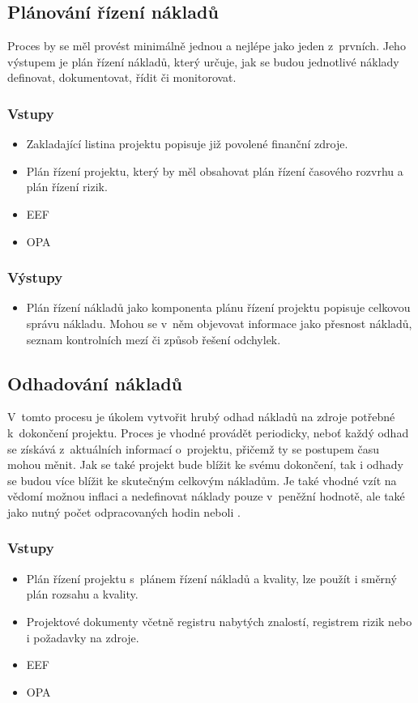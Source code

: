\subsection*{Plánování řízení nákladů}

Proces by se měl provést minimálně jednou a nejlépe jako jeden z~prvních. Jeho výstupem je plán řízení nákladů, který určuje, jak se budou jednotlivé náklady definovat, dokumentovat, řídit či monitorovat.

\subsubsection*{Vstupy}
\begin{itemize}
    \item Zakladající listina projektu popisuje již povolené finanční zdroje.
    \item Plán řízení projektu, který by měl obsahovat plán řízení časového rozvrhu a plán řízení rizik.
    \item EEF
    \item OPA
\end{itemize}
\subsubsection*{Výstupy}
\begin{itemize}
    \item Plán řízení nákladů jako komponenta plánu řízení projektu popisuje celkovou správu nákladu. Mohou se v~něm objevovat informace jako přesnost nákladů, seznam kontrolních mezí či způsob řešení odchylek. 
\end{itemize}

\subsection*{Odhadování nákladů}

V~tomto procesu je úkolem vytvořit hrubý odhad nákladů na zdroje potřebné k~dokončení projektu. Proces je vhodné provádět periodicky, neboť každý odhad se získává z~aktuálních informací o~projektu, přičemž ty se postupem času mohou měnit. Jak se také projekt bude blížit ke svému dokončení, tak i odhady se budou více blížit ke skutečným celkovým nákladům. Je také vhodné vzít na vědomí možnou inflaci a nedefinovat náklady pouze v~peněžní hodnotě, ale také jako nutný počet odpracovaných hodin neboli .


\subsubsection*{Vstupy}
\begin{itemize}
    \item Plán řízení projektu s~plánem řízení nákladů a kvality, lze použít i směrný plán rozsahu a kvality.
    \item Projektové dokumenty včetně registru nabytých znalostí, registrem rizik nebo i požadavky na zdroje.
    \item EEF
    \item OPA
\end{itemize}
